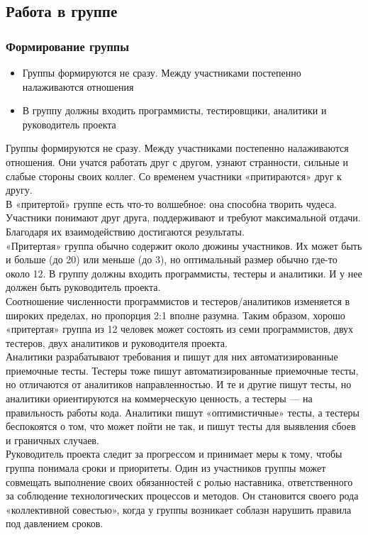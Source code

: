 \documentclass{../industrial-development}
\begin{document}
\subsection{Работа в группе}
\begin{frame} \frametitle{Формирование группы}
\begin{itemize}
  \item Группы формируются не сразу. Между участниками постепенно налаживаются отношения
  \item В группу должны входить программисты, тестировщики, аналитики и руководитель проекта
\end{itemize}
\end{frame}
\lecturenotes
Группы формируются не сразу. Между участниками постепенно налаживаются отношения. Они учатся работать друг с другом, узнают странности, сильные и слабые стороны своих коллег. Со временем участники «притираются» друг к другу.\\
В «притертой» группе есть что-то волшебное: она способна творить чудеса. Участники понимают друг друга, поддерживают и требуют максимальной отдачи. Благодаря их взаимодействию достигаются результаты.\\
«Притертая» группа обычно содержит около дюжины участников. Их может быть и больше (до 20) или меньше (до 3), но оптимальный размер обычно где-то около 12. В группу должны входить программисты, тестеры и аналитики. И у нее должен быть руководитель проекта.\\
Соотношение численности программистов и тестеров/аналитиков изменяется в широких пределах, но пропорция 2:1 вполне разумна. Таким образом, хорошо «притертая» группа из 12 человек может состоять из семи программистов, двух тестеров, двух аналитиков и руководителя проекта.\\
Аналитики разрабатывают требования и пишут для них автоматизированные приемочные тесты. Тестеры тоже пишут автоматизированные приемочные тесты, но отличаются от аналитиков направленностью. И те и другие пишут тесты, но аналитики ориентируются на коммерческую ценность, а тестеры — на правильность работы кода. Аналитики пишут «оптимистичные» тесты, а тестеры беспокоятся о том, что
может пойти не так, и пишут тесты для выявления сбоев и граничных случаев.\\
Руководитель проекта следит за прогрессом и принимает меры к тому, чтобы группа понимала сроки и приоритеты. Один из участников группы может совмещать выполнение своих обязанностей с ролью наставника, ответственного за соблюдение технологических процессов и методов. Он становится своего рода «коллективной совестью», когда у группы возникает соблазн нарушить правила под давлением сроков.\\
\end{document}
